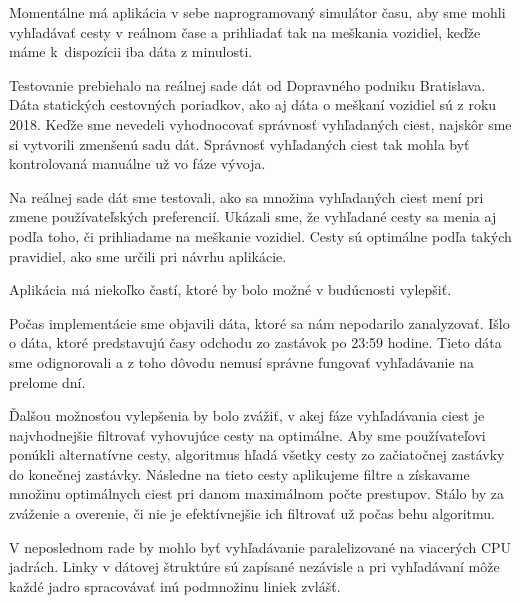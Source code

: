 Momentálne má aplikácia v sebe naprogramovaný simulátor času, aby sme mohli vyhľadávať cesty v reálnom čase a prihliadať tak na meškania vozidiel, keďže máme k~dispozícii iba dáta z minulosti. 

Testovanie prebiehalo na reálnej sade dát od Dopravného podniku Bratislava. Dáta statických cestovných poriadkov, ako aj dáta o meškaní vozidiel sú z roku 2018. Keďže sme nevedeli vyhodnocovať správnosť vyhľadaných ciest, najskôr sme si vytvorili zmenšenú sadu dát. Správnosť vyhľadaných ciest tak mohla byť kontrolovaná manuálne už vo fáze vývoja. 

Na reálnej sade dát sme testovali, ako sa množina vyhľadaných ciest mení pri zmene používateľských preferencií. Ukázali sme, že vyhľadané cesty sa menia aj podľa toho, či prihliadame na meškanie vozidiel. Cesty sú optimálne podľa takých pravidiel, ako sme určili pri návrhu aplikácie. 

Aplikácia má niekoľko častí, ktoré by bolo možné v budúcnosti vylepšiť. 

Počas implementácie sme objavili dáta, ktoré sa nám nepodarilo zanalyzovať. Išlo o dáta, ktoré predstavujú časy odchodu zo zastávok po 23:59 hodine. Tieto dáta sme odignorovali a z toho dôvodu nemusí správne fungovať vyhľadávanie na prelome dní. 

Ďalšou možnosťou vylepšenia by bolo zvážiť, v akej fáze vyhľadávania ciest je najvhodnejšie filtrovať vyhovujúce cesty na optimálne. Aby sme používateľovi ponúkli alternatívne cesty, algoritmus hľadá všetky cesty zo začiatočnej zastávky do konečnej zastávky. Následne na tieto cesty aplikujeme filtre a získavame množinu optimálnych ciest pri danom maximálnom počte prestupov. Stálo by za zváženie a overenie, či nie je efektívnejšie ich filtrovať už počas behu algoritmu.

V neposlednom rade by mohlo byť vyhľadávanie paralelizované na viacerých CPU jadrách. Linky v dátovej štruktúre sú zapísané nezávisle a pri vyhľadávaní môže každé jadro spracovávať inú podmnožinu liniek zvlášť.

